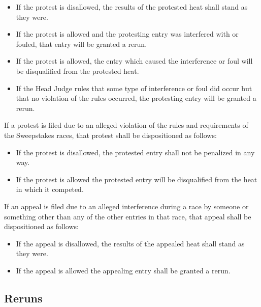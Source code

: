 	\begin{itemize}

		\item
		If the protest is disallowed, the results of the protested heat shall stand as they were.

		\item
		If the protest is allowed and the protesting entry was interfered with or fouled, that entry will be granted a rerun.

		\item
		If the protest is allowed, the entry which caused the interference or foul will be disqualified from the protested heat.

		\item
		If the Head Judge rules that some type of interference or foul did occur but that no violation of the rules occurred, the protesting entry will be granted a rerun.

	\end{itemize}

	\noindent If a protest is filed due to an alleged violation of the rules and requirements of the Sweepstakes races, that protest shall be dispositioned as follows:

	\begin{itemize}

		\item
		If the protest is disallowed, the protested entry shall not be penalized in any way.

		\item
		If the protest is allowed the protested entry will be disqualified from the heat in which it competed.

	\end{itemize}

	\noindent If an appeal is filed due to an alleged interference during a race by someone or something other than any of the other entries in that race, that appeal shall be dispositioned as follows:

	\begin{itemize}

		\item
		If the appeal is disallowed, the results of the appealed heat shall stand as they were.

		\item
		If the appeal is allowed the appealing entry shall be granted a rerun.

	\end{itemize}


\subsection{Reruns}


